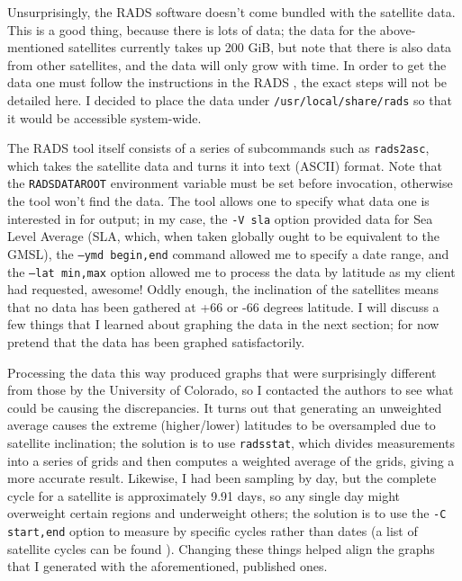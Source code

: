 \documentclass{article}
\begin{document}
Unsurprisingly, the RADS software doesn't come bundled with the satellite data.  This is a good thing, because there is lots of data; the data for the above-mentioned satellites currently takes up 200 GiB, but note that there is also data from other satellites, and the data will only grow with time.  In order to get the data one must follow the instructions in the RADS , the exact steps will not be detailed here.  I decided to place the data under \texttt{/usr/local/share/rads} so that it would be accessible system-wide.

The RADS tool itself consists of a series of subcommands such as \texttt{rads2asc}, which takes the satellite data and turns it into text (ASCII) format.  Note that the \texttt{RADSDATAROOT} environment variable must be set before invocation, otherwise the tool won't find the data.  The tool allows one to specify what data one is interested in for output; in my case, the \texttt{-V sla} option provided data for Sea Level Average (SLA, which, when taken globally ought to be equivalent to the GMSL), the \texttt{--ymd begin,end} command allowed me to specify a date range, and the \texttt{--lat min,max} option allowed me to process the data by latitude as my client had requested, awesome!  Oddly enough, the inclination of the satellites means that no data has been gathered at +66 or -66 degrees latitude.  I will discuss a few things that I learned about graphing the data in the next section; for now pretend that the data has been graphed satisfactorily.

Processing the data this way produced graphs that were surprisingly different from those  by the University of Colorado, so I contacted the authors to see what could be causing the discrepancies.  It turns out that generating an unweighted average causes the extreme (higher/lower) latitudes to be oversampled due to satellite inclination; the solution is to use \texttt{radsstat}, which divides measurements into a series of grids and then computes a weighted average of the grids, giving a more accurate result.  Likewise, I had been sampling by day, but the complete cycle for a satellite is approximately 9.91 days, so any single day might overweight certain regions and underweight others; the solution is to use the \texttt{-C start,end} option to measure by specific cycles rather than dates (a list of satellite cycles can be found ).  Changing these things helped align the graphs that I generated with the aforementioned, published ones.
\end{document}
